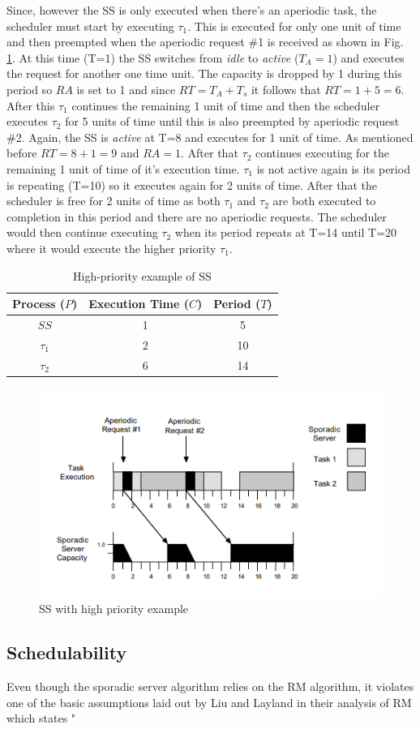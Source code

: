 \documentclass[conference]{IEEEtran}
\begin{document}
Since, however the SS is only executed when there's an aperiodic task, the scheduler must start by executing $\tau_1$. This is executed for only one unit of time and then preempted when the aperiodic request \#1 is received as shown in Fig. \ref{fig:high priority ss graph}. At this time (T=1) the SS switches from \textit{idle} to \textit{active} ($T_A = 1$) and executes the request for another one time unit. The capacity is dropped by 1 during this period so $RA$ is set to 1 and since $RT = T_A + T_s$ it follows that $RT= 1+5=6$. After this $\tau_1$ continues the remaining 1 unit of time and then the scheduler executes $\tau_2$ for 5 units of time until this is also preempted by aperiodic request \#2. Again, the SS is \textit{active} at T=8 and executes for 1 unit of time. As mentioned before $RT= 8+1=9$ and $RA=1$. After that $\tau_2$ continues executing for the remaining 1 unit of time of it's execution time. $\tau_1$ is not active again is its period is repeating (T=10) so it executes again for 2 units of time. After that the scheduler is free for 2 units of time as both $\tau_1$ and $\tau_2$ are both executed to completion in this period and there are no aperiodic requests. The scheduler would then continue executing $\tau_2$ when its period repeats at T=14 until T=20 where it would execute the higher priority $\tau_1$.
\begin{table}[h]
    \centering
    \begin{tabular}{ |c|c|c| } 
    \hline
        Process ($P$) & Execution Time ($C$) & Period ($T$)\\
        \hline\hline
         ${SS}$& 1 & 5 \\
         \hline
         ${\tau_1}$& 2 & 10 \\
         \hline
         ${\tau_2}$& 6 & 14 \\
         \hline
         
    \end{tabular}
    \vspace{1em}
    \caption{High-priority example of SS}
    \label{tab:high priority ss table}
\end{table}
\begin{figure}[h]
    \centering
    \includegraphics{high priority ss.png}
    \caption{SS with high priority example}
    \label{fig:high priority ss graph}
\end{figure}
\subsection{Schedulability}
Even though the sporadic server algorithm relies on the RM algorithm, it violates one of the basic assumptions laid out by Liu and Layland in their analysis of RM\cite{schedulingformula} which states "
 

\end{document}
